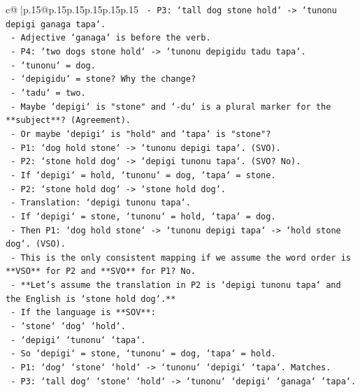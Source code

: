 \documentclass{article}
\begin{document}
{\begin{supertabular}{c@{$\;$}|p{.15\linewidth}@{}p{.15\linewidth}p{.15\linewidth}p{.15\linewidth}p{.15\linewidth}p{.15\linewidth}}
{{{\texttt{       {-} P3: `tall dog stone hold` {-}> `tunonu depigi ganaga tapa`.} \\
\texttt{         {-} Adjective `ganaga` is before the verb.} \\
\texttt{       {-} P4: `two dogs stone hold` {-}> `tunonu depigidu tadu tapa`.} \\
\texttt{         {-} `tunonu` = dog.} \\
\texttt{         {-} `depigidu` = stone? Why the change?} \\
\texttt{         {-} `tadu` = two.} \\
\texttt{         {-} Maybe `depigi` is "stone" and `{-}du` is a plural marker for the **subject**? (Agreement).} \\
\texttt{         {-} Or maybe `depigi` is "hold" and `tapa` is "stone"?} \\
\texttt{           {-} P1: `dog hold stone` {-}> `tunonu depigi tapa`. (SVO).} \\
\texttt{           {-} P2: `stone hold dog` {-}> `depigi tunonu tapa`. (SVO? No).} \\
\texttt{           {-} If `depigi` = hold, `tunonu` = dog, `tapa` = stone.} \\
\texttt{           {-} P2: `stone hold dog` {-}> `stone hold dog`.} \\
\texttt{           {-} Translation: `depigi tunonu tapa`.} \\
\texttt{           {-} If `depigi` = stone, `tunonu` = hold, `tapa` = dog.} \\
\texttt{           {-} Then P1: `dog hold stone` {-}> `tunonu depigi tapa` {-}> `hold stone dog`. (VSO).} \\
\texttt{           {-} This is the only consistent mapping if we assume the word order is **VSO** for P2 and **SVO** for P1? No.} \\
\texttt{     {-} **Let's assume the translation in P2 is `depigi tunonu tapa` and the English is `stone hold dog`.**} \\
\texttt{       {-} If the language is **SOV**:} \\
\texttt{         {-} `stone` `dog` `hold`.} \\
\texttt{         {-} `depigi` `tunonu` `tapa`.} \\
\texttt{         {-} So `depigi` = stone, `tunonu` = dog, `tapa` = hold.} \\
\texttt{         {-} P1: `dog` `stone` `hold` {-}> `tunonu` `depigi` `tapa`. Matches.} \\
\texttt{         {-} P3: `tall dog` `stone` `hold` {-}> `tunonu` `depigi` `ganaga` `tapa`.} \\
}}}
\end{supertabular}}
\end{document}

